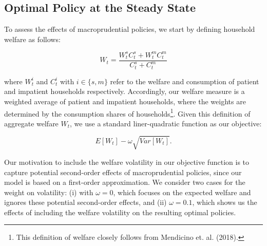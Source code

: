 \documentclass[12pt]{article}
\numberwithin{equation}{section}
\begin{document}
\subsection{Optimal Policy at the Steady State }


To assess the effects of macroprudential policies, we start by defining household welfare as follows: 

$$ W_t = \frac{W^s_t C^s_t + W^m_t C^m_t}{C^s_t + C^m_t} $$

where $W_t^i$  and $C_t^i$ with $i \in \{s,m \}$ refer to the welfare and consumption of patient and impatient households respectively. Accordingly, our welfare measure is a weighted average of patient and impatient households, where the weights are determined by the consumption shares of households\footnote{This definition of welfare closely follows from Mendicino et. al. (2018).}. Given this definition of aggregate welfare $W_t$, we use a standard liner-quadratic function as our objective:   

$$ E[W_t] - \omega \sqrt{Var[W_t]}.$$

Our motivation to include the welfare volatility in our objective function is to capture potential second-order effects of macroprudential policies, since our model is based on a first-order approximation. We consider two cases for the weight on volatility: (i) with $\omega=0$, which focuses on the expected welfare and ignores these potential second-order effects, and (ii) $\omega=0.1$, which shows us the effects of including the welfare volatility on the resulting optimal policies. 
\end{document}
